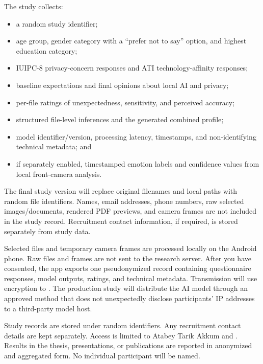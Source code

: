 \documentclass[10pt,a4paper]{article}
\begin{document}
The study collects:
\begin{itemize}
  \item a random study identifier;
  \item age group, gender category with a ``prefer not to say'' option, and highest education category;
  \item IUIPC-8 privacy-concern responses and ATI technology-affinity responses;
  \item baseline expectations and final opinions about local AI and privacy;
  \item per-file ratings of unexpectedness, sensitivity, and perceived accuracy;
  \item structured file-level inferences and the generated combined profile;
  \item model identifier/version, processing latency, timestamps, and non-identifying technical metadata; and
  \item if separately enabled, timestamped emotion labels and confidence values from local front-camera analysis.
\end{itemize}

The final study version will replace original filenames and local paths with random file identifiers. Names, email addresses, phone numbers, raw selected images/documents, rendered PDF previews, and camera frames are not included in the study record. Recruitment contact information, if required, is stored separately from study data.

Selected files and temporary camera frames are processed locally on the Android phone. Raw files and frames are not sent to the research server. After you have consented, the app exports one pseudonymized record containing questionnaire responses, model outputs, ratings, and technical metadata. Transmission will use encryption to . The production study will distribute the AI model through an approved method that does not unexpectedly disclose participants' IP addresses to a third-party model host.

Study records are stored under random identifiers. Any recruitment contact details are kept separately. Access is limited to Atabey Tarik Akkum and . Results in the thesis, presentations, or publications are reported in anonymized and aggregated form. No individual participant will be named.
\end{document}
